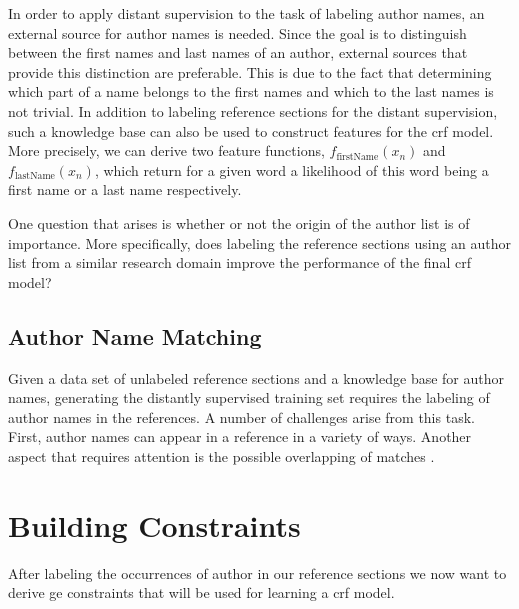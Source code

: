 In order to apply distant supervision to the task of labeling author names, an external source for author names is needed.
Since the goal is to distinguish between the first names and last names of an author, external sources that provide this distinction are preferable.
This is due to the fact that determining which part of a name belongs to the first names and which to the last names is not trivial.
In addition to labeling reference sections for the distant supervision, such a knowledge base can also be used to construct features for the \gls{crf} model.
More precisely, we can derive two feature functions, $f_{\text{firstName}}(x_n)$ and $f_{\text{lastName}}(x_n)$, which return for a given word a likelihood of this word being a first name or a last name respectively.

\bigskip

One question that arises is whether or not the origin of the author list is of importance.
More specifically, does labeling the reference sections using an author list from a similar research domain improve the performance of the final \gls{crf} model?

\subsection{Author Name Matching}\label{subsec:ae-author-name-matching}

Given a data set of unlabeled reference sections and a knowledge base for author names, generating the distantly supervised training set requires the labeling of author names in the references.
A number of challenges arise from this task.
First, author names can appear in a reference in a variety of ways.
Another aspect that requires attention is the possible overlapping of matches .

\section{Building  Constraints}\label{sec:ae-training-crfs}

After labeling the occurrences of author in our reference sections we now want to derive \gls{ge} constraints that will be used for learning a \gls{crf} model.

